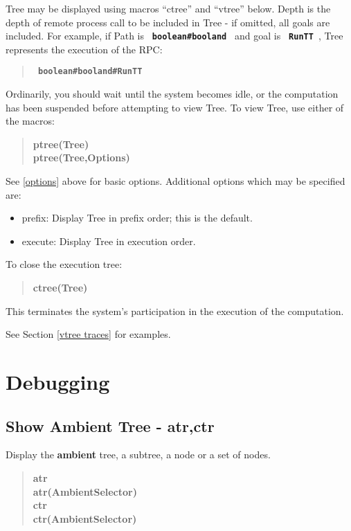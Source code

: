 \documentclass[twoside,10pt]{report}
\begin{document}
\noindent
Tree may be displayed using macros ``ctree'' and ``vtree'' below.
Depth is the depth of remote process call to be included in Tree -
if omitted, all goals are included.
For example, if Path is {\bf \verb+ boolean#booland +}
and goal is {\bf \verb+ RunTT +}, Tree represents the execution of the RPC:

\begin{verse}
 {\bfseries
    \verb+ boolean#booland#RunTT +
 }
\end{verse}

\noindent
Ordinarily, you should wait until the system becomes idle, or the
computation has been suspended before attempting to view Tree.
To view Tree, use either of the macros:

\begin{verse}
 {\bfseries
    ptree(Tree) \\
    ptree(Tree,Options)
 }
\end{verse}

\noindent
See \ref{options} above for basic options.
Additional options which may be specified are:

\begin{itemize}
\item prefix:   Display Tree in prefix order; this is the default.
\item execute:  Display Tree in execution order.
\end{itemize}

\noindent
To close the execution tree:

\begin{verse}
 {\bfseries
    ctree(Tree)
 }
\end{verse}

\noindent
This terminates the system's
participation in the execution of the computation.

\noindent
See Section \ref{vtree traces} for examples.

\section{Debugging }

\subsection{Show Ambient Tree - atr,ctr}
\label{xtr}

Display the {\bf ambient} tree, a subtree, a node or a set of nodes.

\begin{verse}
 {\bfseries
   atr \\
   atr(AmbientSelector) \\
   ctr \\
   ctr(AmbientSelector)
 }
\end{verse}
\end{document}
